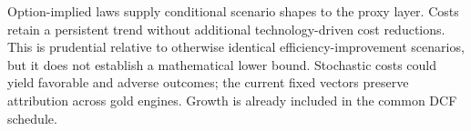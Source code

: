 \begin{methodbox}
Option-implied laws supply conditional scenario shapes to the proxy layer. Costs retain a persistent trend without additional technology-driven cost reductions. This is prudential relative to otherwise identical efficiency-improvement scenarios, but it does not establish a mathematical lower bound. Stochastic costs could yield favorable and adverse outcomes; the current fixed vectors preserve attribution across gold engines. Growth is already included in the common DCF schedule.
\end{methodbox}
